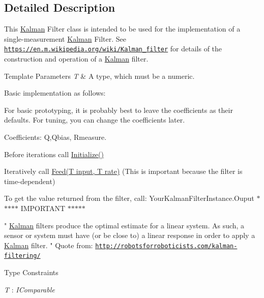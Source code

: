 \subsection{Detailed Description}
This \hyperlink{class_robotics_library_1_1_filters_1_1_kalman}{Kalman} Filter class is intended to be used for the implementation of a single-\/measurement \hyperlink{class_robotics_library_1_1_filters_1_1_kalman}{Kalman} Filter. See \href{https://en.m.wikipedia.org/wiki/Kalman_filter}{\tt https\+://en.\+m.\+wikipedia.\+org/wiki/\+Kalman\+\_\+filter} for details of the construction and operation of a \hyperlink{class_robotics_library_1_1_filters_1_1_kalman}{Kalman} filter.


\begin{DoxyTemplParams}{Template Parameters}
{\em T} & A type, which must be a numeric.\\
\hline
\end{DoxyTemplParams}


Basic implementation as follows\+:

For basic prototyping, it is probably best to leave the coefficients as their defaults. For tuning, you can change the coefficients later.

Coefficients\+: {\ttfamily  Q,}{\ttfamily  Qbias, }{\ttfamily  Rmeasure}.


\begin{DoxyItemize}
\item Before iterations call {\ttfamily \hyperlink{class_robotics_library_1_1_filters_1_1_kalman_aec1fb77c692d3d444d1cbd60f2b2592c}{Initialize()}}
\item Iteratively call {\ttfamily  \hyperlink{class_robotics_library_1_1_filters_1_1_kalman_a5c2f27a6d48ede3369d4b9ac776954db}{Feed(\+T input, T rate)}} (This is important because the filter is time-\/dependent)
\item To get the value returned from the filter, call\+: {\ttfamily  Your\+Kalman\+Filter\+Instance.\+Ouput } $\ast$$\ast$$\ast$$\ast$$\ast$ I\+M\+P\+O\+R\+T\+A\+NT $\ast$$\ast$$\ast$$\ast$$\ast$
\end{DoxyItemize}

" \hyperlink{class_robotics_library_1_1_filters_1_1_kalman}{Kalman} filters produce the optimal estimate for a linear system. As such, a sensor or system must have (or be close to) a linear response in order to apply a \hyperlink{class_robotics_library_1_1_filters_1_1_kalman}{Kalman} filter. " Quote from\+: \href{http://robotsforroboticists.com/kalman-filtering/}{\tt http\+://robotsforroboticists.\+com/kalman-\/filtering/} \begin{Desc}
\item[Type Constraints]\begin{description}
\item[{\em T} : {\em I\+Comparable}]\end{description}
\end{Desc}


